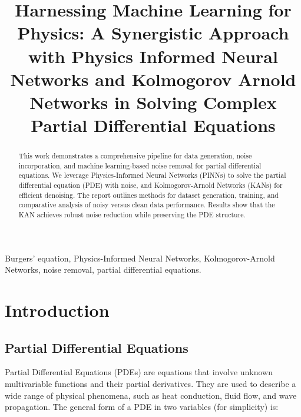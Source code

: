 \documentclass[conference]{IEEEtran}
\begin{document}
\title{Harnessing Machine Learning for Physics: A Synergistic Approach with Physics Informed Neural Networks and Kolmogorov Arnold Networks in Solving Complex Partial Differential Equations}

\author{
    \and
    \and
}

\maketitle

\begin{abstract}
This work demonstrates a comprehensive pipeline for data generation, noise incorporation, and machine learning-based noise removal for partial differential equations. We leverage Physics-Informed Neural Networks (PINNs) to solve the partial differential equation (PDE) with noise, and Kolmogorov-Arnold Networks (KANs) for efficient denoising. The report outlines methods for dataset generation, training, and comparative analysis of noisy versus clean data performance. Results show that the KAN achieves robust noise reduction while preserving the PDE structure.
\end{abstract}

\begin{IEEEkeywords}
Burgers' equation, Physics-Informed Neural Networks, Kolmogorov-Arnold Networks, noise removal, partial differential equations.
\end{IEEEkeywords}

\section{Introduction}
\subsection{Partial Differential Equations}
Partial Differential Equations (PDEs) are equations that involve unknown multivariable functions and their partial derivatives. They are used to describe a wide range of physical phenomena, such as heat conduction, fluid flow, and wave propagation. The general form of a PDE in two variables (for simplicity) is:
\end{document}
